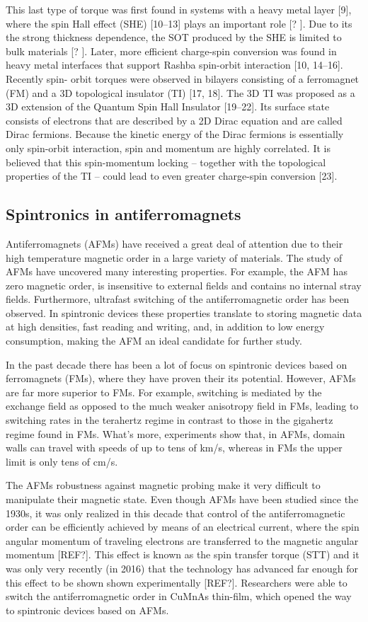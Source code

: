 This last type of torque was first found in systems with a heavy metal layer [9], where the spin Hall
effect (SHE) [10–13] plays an important role [? ]. Due to its the strong thickness dependence, the SOT
produced by the SHE is limited to bulk materials [? ]. Later, more efficient charge-spin conversion was
found in heavy metal interfaces that support Rashba spin-orbit interaction [10, 14–16].
Recently spin- orbit torques were observed in bilayers consisting of a ferromagnet (FM) and a 3D
topological insulator (TI) [17, 18]. The 3D TI was proposed as a 3D extension of the Quantum Spin
Hall Insulator [19–22]. Its surface state consists of electrons that are described by a 2D Dirac
equation and are called Dirac fermions. Because the kinetic energy of the Dirac fermions is essentially
only spin-orbit interaction, spin and momentum are highly correlated. It is believed that this
spin-momentum locking – together with the topological properties of the TI – could lead to even
greater charge-spin conversion [23]. 

\subsection{Spintronics in antiferromagnets}
Antiferromagnets (AFMs) have received a great deal of attention due to their high temperature magnetic order in a large variety of materials. The study of
AFMs have uncovered many interesting properties. For example, the AFM has zero magnetic order, is
insensitive to external fields and contains no internal stray fields.
Furthermore, ultrafast switching of the antiferromagnetic order has been observed. In
spintronic devices these properties translate to storing magnetic data at high densities, fast
reading and writing, and, in addition to low energy consumption, making the AFM an ideal
candidate for further study.

In the past decade there has been a lot of focus on spintronic devices based on
ferromagnets (FMs), where they have proven their its potential. However,
AFMs are far more superior to FMs. For example, switching is mediated by the
exchange field as opposed to the much weaker anisotropy field in FMs, leading to
switching rates in the terahertz regime in contrast to those in the gigahertz regime found in
FMs. What’s more, experiments show that, in
AFMs, domain walls can travel with speeds of up to tens of km/s, whereas in FMs
the upper limit is only tens of cm/s.

The AFMs robustness against magnetic probing make it very difficult to manipulate their
magnetic state. Even though AFMs have been studied since the 1930s, it was only
realized in this decade that control of the antiferromagnetic order can be efficiently 
achieved by means of an electrical current, where the spin angular momentum of traveling
electrons are transferred to the magnetic angular momentum [REF?]. This effect is
known as the spin transfer torque (STT) and it was only very recently (in 2016) that the
technology has advanced far enough for this effect to be shown shown experimentally
[REF?]. Researchers were able to switch the antiferromagnetic order in CuMnAs thin-film,
which opened the way to spintronic devices based on AFMs.

